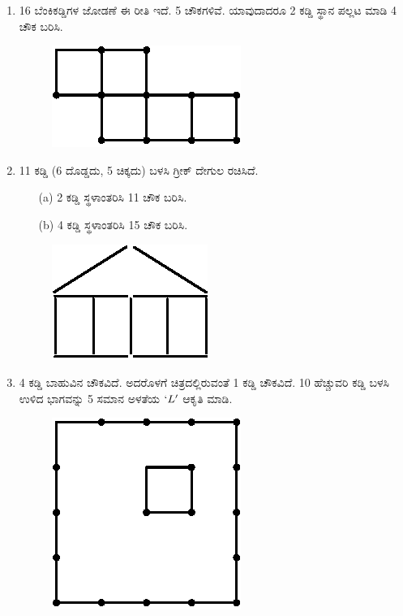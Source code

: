 \begin{enumerate}
\item 16 ಬೆಂಕಿಕಡ್ಡಿಗಳ ಜೋಡಣೆ ಈ ರೀತಿ ಇದೆ. 5 ಚೌಕಗಳಿವೆ. ಯಾವುದಾದರೂ 2 ಕಡ್ಡಿ ಸ್ಥಾನ ಪಲ್ಲಟ ಮಾಡಿ 4 ಚೌಕ ಬರಿಸಿ. 
\begin{figure}[H]
\centering
\includegraphics[scale=0.9]{images/chap9/q10.eps}
\end{figure}

\item 11 ಕಡ್ಡಿ (6 ದೊಡ್ಡದು, 5 ಚಿಕ್ಕದು) ಬಳಸಿ ಗ್ರೀಕ್ ದೇಗುಲ ರಚಿಸಿದೆ. 
\begin{itemize}
\item[(a)] 2 ಕಡ್ಡಿ ಸ್ಥಳಾಂತರಿಸಿ 11 ಚೌಕ ಬರಿಸಿ. 
\item[(b)] 4 ಕಡ್ಡಿ ಸ್ಥಳಾಂತರಿಸಿ 15 ಚೌಕ ಬರಿಸಿ. 
\end{itemize} 

\begin{figure}[H]
\centering
\includegraphics[scale=0.9]{images/chap9/q11.eps}
\end{figure}

\item 4 ಕಡ್ಡಿ ಬಾಹುವಿನ ಚೌಕವಿದೆ. ಅದರೊಳಗೆ ಚಿತ್ರದಲ್ಲಿರುವಂತೆ 1 ಕಡ್ಡಿ ಚೌಕವಿದೆ. 10 ಹೆಚ್ಚುವರಿ ಕಡ್ಡಿ ಬಳಸಿ ಉಳಿದ ಭಾಗವನ್ನು 5 ಸಮಾನ ಅಳತೆಯ $`L'$ ಆಕೃತಿ ಮಾಡಿ. 

\begin{figure}[H]
\centering
\includegraphics[scale=1.3]{images/chap9/q12.eps}
\end{figure}


\end{enumerate}
